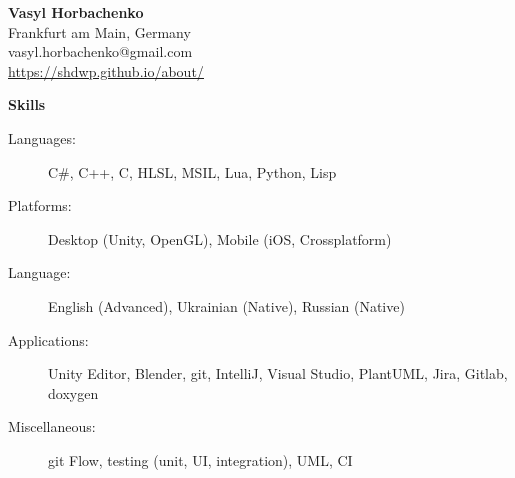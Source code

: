 \documentclass[letterpaper,11pt]{article}
\newcommand{\resheading}[1]{{\vspace{.2in} \large \colorbox{mygrey}{\begin{minipage}{\textwidth}{\textbf{#1 \vphantom{p\^{E}}}}\end{minipage}}}}
\begin{document}
\begin{minipage}{.70\linewidth}
	\begin{center}
		\textbf{\Large Vasyl Horbachenko} \\
		Frankfurt am Main, Germany \\
		vasyl.horbachenko@gmail.com \\
		\href{https://shdwp.github.io/about/}{\textcolor{linkblue}{\underline{https://shdwp.github.io/about/}}} \\

		\vspace{0.2in}
		\resheading{Skills}
		\begin{description}
			\item[Languages:]
				C\#, C++, C, HLSL, MSIL, Lua, Python, Lisp
			\item[Platforms:]
				Desktop (Unity, OpenGL), Mobile (iOS, Crossplatform)
		\end{description}
	\end{center}
\end{minipage}
\hfill
\begin{minipage}{.26\linewidth}
	\begin{flushright}
	\end{flushright}
\end{minipage}
\begin{description}
	\item[Language:]
		English (Advanced), Ukrainian (Native), Russian (Native)
	\item[Applications:]
		Unity Editor, Blender, git, IntelliJ, Visual Studio, PlantUML, Jira, Gitlab, doxygen
	\item[Miscellaneous:]
		git Flow, testing (unit, UI, integration), UML, CI
\end{description}
\end{document}
